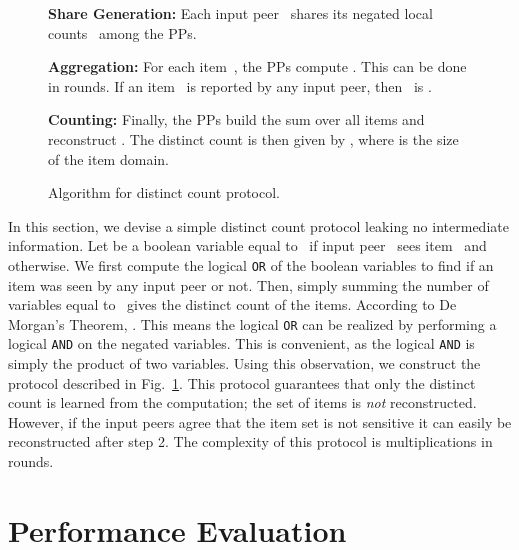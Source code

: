 \documentclass[letterpaper,11pt,onecolumn,titlepage]{article}
\begin{document}
\begin{figure}[t]
	\begin{boxedminipage}{1\textwidth}
	\begin{small}
	\begin{compactenum}

	\item \textbf{Share Generation:} Each input peer~ shares its negated local counts~ among the PPs.
	


	\item \textbf{Aggregation:} For each item~, the PPs
	compute . This can
	be done in  rounds. If an item~ is reported 
	by any input peer, then~ is .
	
	\item \textbf{Counting:} Finally, the PPs build 
	the sum  over all items and reconstruct . 
	The distinct count is then given by , where  is the size of the
	item domain.

	\end{compactenum}
	\end{small}
	\end{boxedminipage}
	\caption{Algorithm for distinct count protocol.}
	\label{box:count}
\end{figure}







In this section, we devise a simple distinct count protocol leaking no intermediate
information. 
Let  be a boolean variable equal to~ if input peer~ sees item~
and  otherwise. We first compute the logical \texttt{OR} of the
boolean variables to find if an item was seen by any input peer or
not. Then, simply summing the number of variables equal to~ gives
the distinct count of the items. 
According to De Morgan's Theorem, .
This means the logical \texttt{OR} can be realized by performing a logical \texttt{AND}
on the negated variables. This is convenient, as the logical \texttt{AND} is
simply the product of two variables. Using this observation, we construct the protocol described in Fig.~\ref{box:count}.
This protocol guarantees that only the distinct count is learned from
the computation; the set of items is \emph{not}
reconstructed. However, if the input peers agree that the item set is not
sensitive it can easily be reconstructed after step 2.
The complexity of this protocol is  multiplications in  rounds.


\section{Performance Evaluation}
\label{sec:evaluation}
\end{document}
